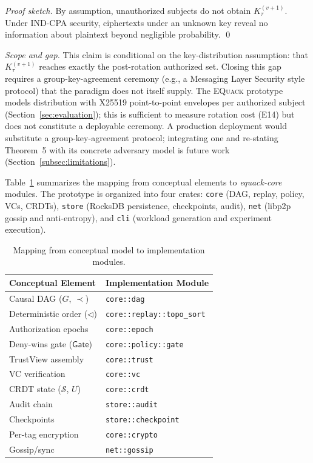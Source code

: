 \documentclass[10pt,journal,compsoc]{IEEEtran}
\newcommand{\equack}{\textsc{EQuack}}
\begin{document}
\textit{Proof sketch.} By assumption, unauthorized subjects do not obtain $K_{\tau}^{(v+1)}$. Under IND-CPA security, ciphertexts under an unknown key reveal no information about plaintext beyond negligible probability. \qed

\textit{Scope and gap.} This claim is conditional on the key-distribution assumption: that $K_{\tau}^{(v+1)}$ reaches exactly the post-rotation authorized set. Closing this gap requires a group-key-agreement ceremony (e.g., a Messaging Layer Security style protocol) that the paradigm does not itself supply. The \equack{} prototype models distribution with X25519 point-to-point envelopes per authorized subject (Section~\ref{sec:evaluation}); this is sufficient to measure rotation cost (E14) but does not constitute a deployable ceremony. A production deployment would substitute a group-key-agreement protocol; integrating one and re-stating Theorem~5 with its concrete adversary model is future work (Section~\ref{subsec:limitations}).


Table~\ref{tab:impl-mapping} summarizes the mapping from conceptual elements to \textit{equack-core} modules. The prototype is organized into four crates: \texttt{core} (DAG, replay, policy, VCs, CRDTs), \texttt{store} (RocksDB persistence, checkpoints, audit), \texttt{net} (libp2p gossip and anti-entropy), and \texttt{cli} (workload generation and experiment execution).

\begin{table}[!htbp]
\centering
\caption{Mapping from conceptual model to implementation modules.}
\label{tab:impl-mapping}
\begin{tabular}{@{}ll@{}}
\toprule
\textbf{Conceptual Element} & \textbf{Implementation Module} \\
\midrule
Causal DAG ($G$, $\prec$) & \texttt{core::dag} \\
Deterministic order ($\triangleleft$) & \texttt{core::replay::topo\_sort} \\
Authorization epochs & \texttt{core::epoch} \\
Deny-wins gate ($\mathsf{Gate}$) & \texttt{core::policy::gate} \\
TrustView assembly & \texttt{core::trust} \\
VC verification & \texttt{core::vc} \\
CRDT state ($\mathcal{S}$, $U$) & \texttt{core::crdt} \\
Audit chain & \texttt{store::audit} \\
Checkpoints & \texttt{store::checkpoint} \\
Per-tag encryption & \texttt{core::crypto} \\
Gossip/sync & \texttt{net::gossip} \\
\bottomrule
\end{tabular}
\end{table}
\end{document}
